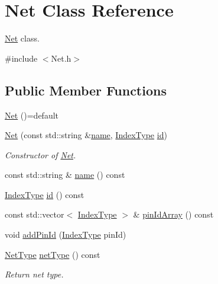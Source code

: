\hypertarget{classNet}{}\section{Net Class Reference}
\label{classNet}


\hyperlink{classNet}{Net} class.  




{\ttfamily \#include $<$Net.\+h$>$}

\subsection*{Public Member Functions}
\begin{DoxyCompactItemize}
\item 
\hyperlink{classNet_ad2d03f95c5cb74fb3ebcb79738e5a76c}{Net} ()=default
\item 
\hyperlink{classNet_ae7ae2cad153da40e1c70062ef2903358}{Net} (const std\+::string \&\hyperlink{classNet_a1782a27bedb6c07e8406d93182107d0f}{name}, \hyperlink{type_8h_a581e8093e28e7362f2b6937296190676}{Index\+Type} \hyperlink{classNet_a4a27de129427445971fcb3a274bad711}{id})
\begin{DoxyCompactList}\small\item\em Constructor of \hyperlink{classNet}{Net}. \end{DoxyCompactList}\item 
const std\+::string \& \hyperlink{classNet_a1782a27bedb6c07e8406d93182107d0f}{name} () const
\item 
\hyperlink{type_8h_a581e8093e28e7362f2b6937296190676}{Index\+Type} \hyperlink{classNet_a4a27de129427445971fcb3a274bad711}{id} () const
\item 
const std\+::vector$<$ \hyperlink{type_8h_a581e8093e28e7362f2b6937296190676}{Index\+Type} $>$ \& \hyperlink{classNet_a5d7f652001fbd6a99613408fcba08328}{pin\+Id\+Array} () const
\item 
void \hyperlink{classNet_abe94a5298df3441a8b45c68d3f3b16df}{add\+Pin\+Id} (\hyperlink{type_8h_a581e8093e28e7362f2b6937296190676}{Index\+Type} pin\+Id)
\item 
\hyperlink{type_8h_a24f31c8c9240242bd5fa9a415806eabf}{Net\+Type} \hyperlink{classNet_aa74b25d43e1b96f3596661325775f531}{net\+Type} () const
\begin{DoxyCompactList}\small\item\em Return net type. \end{DoxyCompactList}\end{DoxyCompactItemize}
